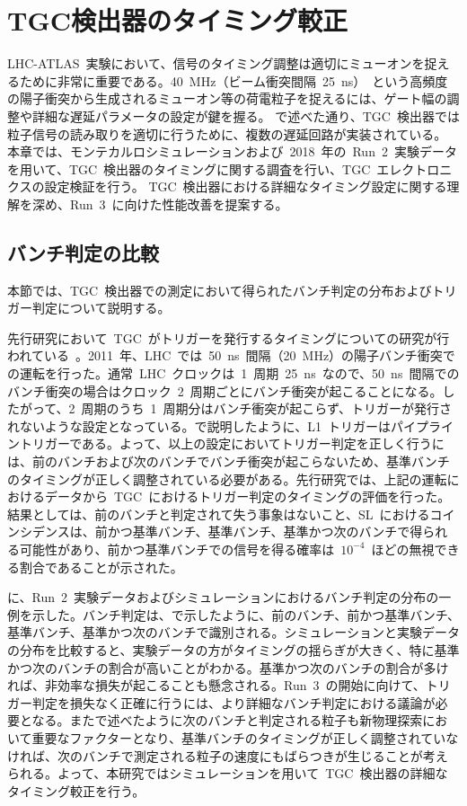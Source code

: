\chapter{TGC検出器のタイミング較正}
\thispagestyle{empty}
\label{chap:5}
LHC-ATLAS~実験において、信号のタイミング調整は適切にミューオンを捉えるために非常に重要である。40~MHz（ビーム衝突間隔~25~ns）~という高頻度の陽子衝突から生成されるミューオン等の荷電粒子を捉えるには、ゲート幅の調整や詳細な遅延パラメータの設定が鍵を握る。
で述べた通り、TGC~検出器では粒子信号の読み取りを適切に行うために、複数の遅延回路が実装されている。
本章では、モンテカルロシミュレーションおよび~2018~年の~Run~2~実験データを用いて、TGC~検出器のタイミングに関する調査を行い、TGC~エレクトロニクスの設定検証を行う。
TGC~検出器における詳細なタイミング設定に関する理解を深め、Run~3~に向けた性能改善を提案する。

\section{バンチ判定の比較}
本節では、TGC~検出器での測定において得られたバンチ判定の分布およびトリガー判定について説明する。

先行研究において~TGC~がトリガーを発行するタイミングについての研究が行われている~\cite{MT:05}。2011~年、LHC~では~50~ns~間隔（20~MHz）の陽子バンチ衝突での運転を行った。通常~LHC~クロックは~1~周期~25~ns~なので、50~ns~間隔でのバンチ衝突の場合はクロック~2~周期ごとにバンチ衝突が起こることになる。したがって、2~周期のうち~1~周期分はバンチ衝突が起こらず、トリガーが発行されないような設定となっている。で説明したように、L1~トリガーはパイプライントリガーである。よって、以上の設定においてトリガー判定を正しく行うには、前のバンチおよび次のバンチでバンチ衝突が起こらないため、基準バンチのタイミングが正しく調整されている必要がある。先行研究では、上記の運転におけるデータから~TGC~におけるトリガー判定のタイミングの評価を行った。結果としては、前のバンチと判定されて失う事象はないこと、SL~におけるコインシデンスは、前かつ基準バンチ、基準バンチ、基準かつ次のバンチで得られる可能性があり、前かつ基準バンチでの信号を得る確率は~$10^{-4}$~ほどの無視できる割合であることが示された。

に、Run~2~実験データおよびシミュレーションにおけるバンチ判定の分布の一例を示した。バンチ判定は、で示したように、前のバンチ、前かつ基準バンチ、基準バンチ、基準かつ次のバンチで識別される。シミュレーションと実験データの分布を比較すると、実験データの方がタイミングの揺らぎが大きく、特に基準かつ次のバンチの割合が高いことがわかる。基準かつ次のバンチの割合が多ければ、非効率な損失が起こることも懸念される。Run~3~の開始に向けて、トリガー判定を損失なく正確に行うには、より詳細なバンチ判定における議論が必要となる。またで述べたように次のバンチと判定される粒子も新物理探索において重要なファクターとなり、基準バンチのタイミングが正しく調整されていなければ、次のバンチで測定される粒子の速度にもばらつきが生じることが考えられる。よって、本研究ではシミュレーションを用いて~TGC~検出器の詳細なタイミング較正を行う。

